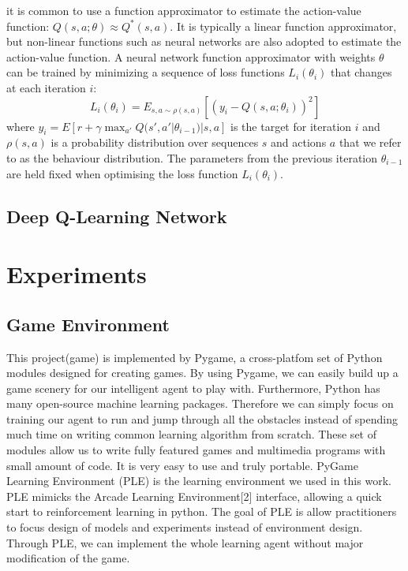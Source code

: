 \documentclass{acmsiggraph}
\begin{document}
it is common to use a function approximator to estimate the action-value function: $Q(s, a; \theta) \approx Q^{*}(s, a)$. It is typically a linear function approximator, but non-linear functions such as neural networks are also adopted to estimate the action-value function. A neural network function approximator with weights $\theta$ can be trained by minimizing a sequence of loss functions $L_i(\theta_i)$ that changes at each iteration $i$:
$$
L_i(\theta_i) = E_{s, a \sim \rho(s, a)} [(y_i - Q(s, a; \theta_i))^2]
$$
where $y_i = E[r + \gamma \max_{a'} Q(s', a' | \theta_{i-1}) | s, a] $ is the target for iteration $i$ and $\rho(s, a)$ is a probability distribution over sequences $s$ and actions $a$ that we refer to as the behaviour distribution. The parameters from the previous iteration $\theta_{i−1}$ are held fixed when optimising the loss function
$L_i(\theta_i)$.


\subsection{Deep Q-Learning Network}


\section{Experiments}
\subsection{Game Environment} 
This project(game) is implemented by Pygame, a cross-platfom set of Python modules designed for creating games. By using Pygame, we can easily build up a game scenery for our intelligent agent to play with. Furthermore, Python has many open-source machine learning packages. Therefore we can simply focus on training our agent to run and jump through all the obstacles instead of spending much time on writing common learning algorithm from scratch. These set of modules allow us to write fully featured games and multimedia programs with small amount of code. It is very easy to use and truly portable. PyGame Learning Environment (PLE) is the learning environment we used in this work. PLE mimicks the Arcade Learning Environment[2] interface, allowing a quick start to reinforcement learning in python. The goal of PLE is allow practitioners to focus design of models and experiments instead of environment design. Through PLE, we can implement the whole learning agent without major modification of the game.
\end{document}
